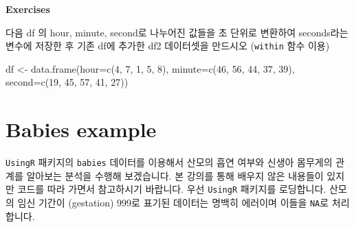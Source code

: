 \documentclass[
]{book}
\newenvironment{Shaded}{\begin{snugshade}}{\end{snugshade}}
\newcommand{\AttributeTok}[1]{\textcolor[rgb]{0.77,0.63,0.00}{#1}}
\newcommand{\ConstantTok}[1]{\textcolor[rgb]{0.00,0.00,0.00}{#1}}
\newcommand{\DecValTok}[1]{\textcolor[rgb]{0.00,0.00,0.81}{#1}}
\newcommand{\DocumentationTok}[1]{\textcolor[rgb]{0.56,0.35,0.01}{\textbf{\textit{#1}}}}
\newcommand{\FunctionTok}[1]{\textcolor[rgb]{0.00,0.00,0.00}{#1}}
\newcommand{\NormalTok}[1]{#1}
\newcommand{\OtherTok}[1]{\textcolor[rgb]{0.56,0.35,0.01}{#1}}
\newcommand{\SpecialCharTok}[1]{\textcolor[rgb]{0.00,0.00,0.00}{#1}}
\begin{document}
\textbf{Exercises}

다음 df 의 hour, minute, second로 나누어진 값들을 초 단위로 변환하여 seconds라는 변수에 저장한 후 기존 df에 추가한 df2 데이터셋을 만드시오 (\texttt{within} 함수 이용)

\begin{Shaded}
\begin{Highlighting}[]
\NormalTok{df }\OtherTok{\textless{}{-}} \FunctionTok{data.frame}\NormalTok{(}\AttributeTok{hour=}\FunctionTok{c}\NormalTok{(}\DecValTok{4}\NormalTok{, }\DecValTok{7}\NormalTok{, }\DecValTok{1}\NormalTok{, }\DecValTok{5}\NormalTok{, }\DecValTok{8}\NormalTok{),}
                 \AttributeTok{minute=}\FunctionTok{c}\NormalTok{(}\DecValTok{46}\NormalTok{, }\DecValTok{56}\NormalTok{, }\DecValTok{44}\NormalTok{, }\DecValTok{37}\NormalTok{, }\DecValTok{39}\NormalTok{),}
                 \AttributeTok{second=}\FunctionTok{c}\NormalTok{(}\DecValTok{19}\NormalTok{, }\DecValTok{45}\NormalTok{, }\DecValTok{57}\NormalTok{, }\DecValTok{41}\NormalTok{, }\DecValTok{27}\NormalTok{))}
\end{Highlighting}
\end{Shaded}

\hypertarget{babies-example}{%
\section{Babies example}\label{babies-example}}

\texttt{UsingR} 패키지의 \texttt{babies} 데이터를 이용해서 산모의 흡연 여부와 신생아 몸무게의 관계를 알아보는 분석을 수행해 보겠습니다. 본 강의를 통해 배우지 않은 내용들이 있지만 코드를 따라 가면서 참고하시기 바랍니다. 우선 \texttt{UsingR} 패키지를 로딩합니다. 산모의 임신 기간이 (gestation) 999로 표기된 데이터는 명백히 에러이며 이들을 \texttt{NA}로 처리합니다.

\begin{Shaded}
\end{Shaded}
\end{document}
